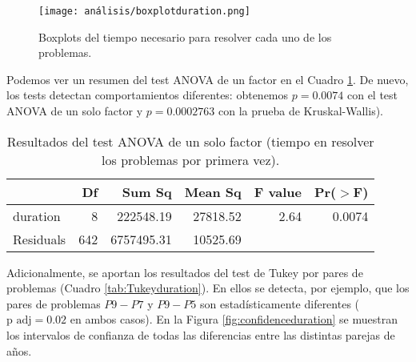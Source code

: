 \begin{figure}[H]
    \centering
    \texttt{[image: análisis/boxplotduration.png]}
    \caption{Boxplots del tiempo necesario para resolver cada uno de los problemas.}
    \label{fig:boxplotduration}
\end{figure}

Podemos ver un resumen del test ANOVA de un factor en el Cuadro \ref{tab:ANOVAduration}. De nuevo, los tests detectan comportamientos diferentes: obtenemos $p=0.0074$ con el test ANOVA de un solo factor y $p=0.0002763$ con la prueba de Kruskal-Wallis).

\begin{table}[H]
\centering
\caption{Resultados del test ANOVA de un solo factor (tiempo en resolver los problemas por primera vez).}
\label{tab:ANOVAduration}
\begin{tabular}{lrrrrr}
  \hline
 & Df & Sum Sq & Mean Sq & F value & Pr($>$F) \\ 
  \hline
duration & 8 & 222548.19 & 27818.52 & 2.64 & 0.0074 \\ 
  Residuals           & 642 & 6757495.31 & 10525.69 &  &  \\ 
   \hline
\end{tabular}
\end{table}

Adicionalmente, se aportan los resultados del test de Tukey por pares de problemas (Cuadro \ref{tab:Tukeyduration}). En ellos se detecta, por ejemplo, que los pares de problemas $P9-P7$ y $P9-P5$ son estadísticamente diferentes ($\text{p adj} = 0.02$ en ambos casos). En la Figura \ref{fig:confidenceduration} se muestran los intervalos de confianza de todas las diferencias entre las distintas parejas de años.


